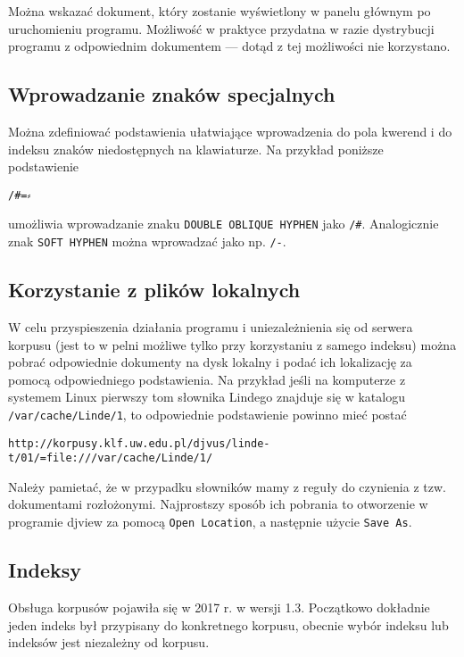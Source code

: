 \documentclass{mwart}
\begin{document}
Można wskazać dokument, który zostanie wyświetlony w panelu głównym po
uruchomieniu programu. Możliwość w praktyce przydatna w razie
dystrybucji programu z odpowiednim dokumentem --- dotąd z tej
możliwości nie korzystano.

\subsection{Wprowadzanie znaków specjalnych}
\label{sec:wprow-znak-specj}
Można zdefiniować podstawienia ułatwiające wprowadzenia do pola
kwerend i do indeksu znaków niedostępnych na klawiaturze. Na przykład
poniższe podstawienie
\begin{verbatim}
/#=⸗
\end{verbatim}
umożliwia wprowadzanie znaku \texttt{DOUBLE OBLIQUE HYPHEN} jako
\texttt{/\#}. Analogicznie znak \texttt{SOFT HYPHEN} można wprowadzać
jako np. \texttt{/-}.

\subsection{Korzystanie z plików lokalnych}
\label{sec:korzystanie-z-plikow}

W celu przyspieszenia działania programu i uniezależnienia się od
serwera korpusu (jest to w pelni możliwe tylko przy korzystaniu z
samego indeksu) można pobrać odpowiednie dokumenty na dysk lokalny i
podać ich lokalizację za pomocą odpowiedniego podstawienia. Na
przykład jeśli na komputerze z systemem Linux pierwszy tom słownika
Lindego znajduje się w katalogu \texttt{/var/cache/Linde/1}, to
odpowiednie podstawienie powinno mieć postać
\begin{verbatim}
http://korpusy.klf.uw.edu.pl/djvus/linde-t/01/=file:///var/cache/Linde/1/
\end{verbatim}

Należy pamietać, że w przypadku słowników mamy z reguły do czynienia z
tzw. dokumentami rozłożonymi. Najprostszy sposób ich pobrania to
otworzenie w programie \textsf{djview} za pomocą \texttt{Open
  Location}, a następnie użycie \texttt{Save As}.

\subsection{Indeksy}
\label{sec:indeksy} 

Obsługa korpusów pojawiła się w 2017 r. w wersji 1.3. Początkowo
dokładnie jeden indeks był przypisany do konkretnego korpusu, obecnie
wybór indeksu lub indeksów jest niezależny od korpusu.
\end{document}
